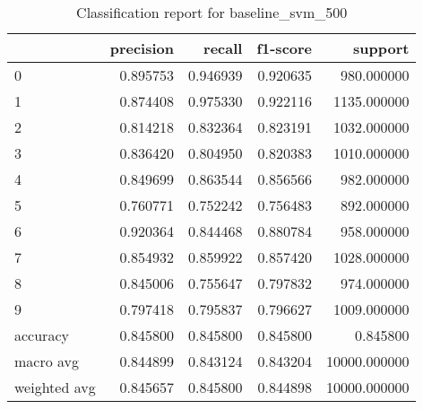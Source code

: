 \begin{table}[htb!]
\centering
\caption{Classification report for baseline_svm_500}
\label{tab:classification-report-baseline_svm_500}
\begin{tabular}{lrrrr}
\toprule
 & precision & recall & f1-score & support \\
\midrule
0 & 0.895753 & 0.946939 & 0.920635 & 980.000000 \\
1 & 0.874408 & 0.975330 & 0.922116 & 1135.000000 \\
2 & 0.814218 & 0.832364 & 0.823191 & 1032.000000 \\
3 & 0.836420 & 0.804950 & 0.820383 & 1010.000000 \\
4 & 0.849699 & 0.863544 & 0.856566 & 982.000000 \\
5 & 0.760771 & 0.752242 & 0.756483 & 892.000000 \\
6 & 0.920364 & 0.844468 & 0.880784 & 958.000000 \\
7 & 0.854932 & 0.859922 & 0.857420 & 1028.000000 \\
8 & 0.845006 & 0.755647 & 0.797832 & 974.000000 \\
9 & 0.797418 & 0.795837 & 0.796627 & 1009.000000 \\
accuracy & 0.845800 & 0.845800 & 0.845800 & 0.845800 \\
macro avg & 0.844899 & 0.843124 & 0.843204 & 10000.000000 \\
weighted avg & 0.845657 & 0.845800 & 0.844898 & 10000.000000 \\
\bottomrule
\end{tabular}
\end{table}
